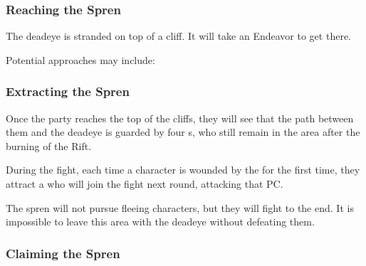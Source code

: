 \subsubsection{Reaching the Spren}

The deadeye is stranded on top of a cliff. It will take an Endeavor to get there. 

Potential approaches may include:






\subsubsection{Extracting the Spren}

Once the party reaches the top of the cliffs, they will see that the path between them and the deadeye is guarded by four \enemyAngerSpren{}s, who still remain in the area after the burning of the Rift.

During the fight, each time a character is wounded by the \enemyAngerSpren{} for the first time, they attract a \enemyPainSpren{} who will join the fight next round, attacking that PC.

The spren will not pursue fleeing characters, but they will fight to the end. It is impossible to leave this area with the deadeye without defeating them.

\subsubsection{Claiming the Spren}

